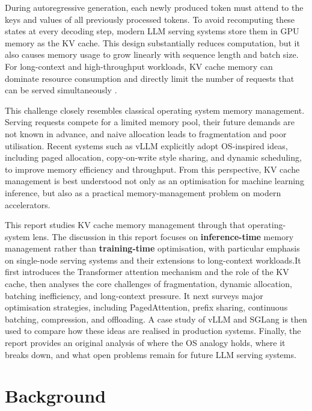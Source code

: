 \documentclass[10pt, a4paper]{article}
\begin{document}
During autoregressive generation, each newly produced token must attend to the
keys and values of all previously processed tokens. To avoid recomputing these
states at every decoding step, modern LLM serving systems store them in GPU
memory as the KV cache. This design substantially reduces computation, but it
also causes memory usage to grow linearly with sequence length and batch size.
For long-context and high-throughput workloads, KV cache memory can dominate
resource consumption and directly limit the number of requests that can be
served simultaneously \cite{kwon2023vllm}.

This challenge closely resembles classical operating system memory management.
Serving requests compete for a limited memory pool, their future demands are not
known in advance, and naive allocation leads to fragmentation and poor
utilisation. Recent systems such as vLLM explicitly adopt OS-inspired ideas,
including paged allocation, copy-on-write style sharing, and dynamic scheduling,
to improve memory efficiency and throughput\cite{kwon2023vllm}. From this
perspective, KV cache management is best understood not only as an optimisation
for machine learning inference, but also as a practical memory-management
problem on modern accelerators.

This report studies KV cache memory management through that operating-system
lens. The discussion in this report focuses on \textbf{inference-time} memory management rather than \textbf{training-time} optimisation, with particular emphasis on single-node serving
systems and their extensions to long-context workloads.It first introduces the Transformer attention mechanism and the role of
the KV cache, then analyses the core challenges of fragmentation, dynamic
allocation, batching inefficiency, and long-context pressure. It next surveys
major optimisation strategies, including PagedAttention, prefix sharing,
continuous batching, compression, and offloading. A case study of vLLM and
SGLang is then used to compare how these ideas are realised in production
systems. Finally, the report provides an original analysis of where the OS
analogy holds, where it breaks down, and what open problems remain for future
LLM serving systems.


\section{Background}
\label{sec:background}
\end{document}
